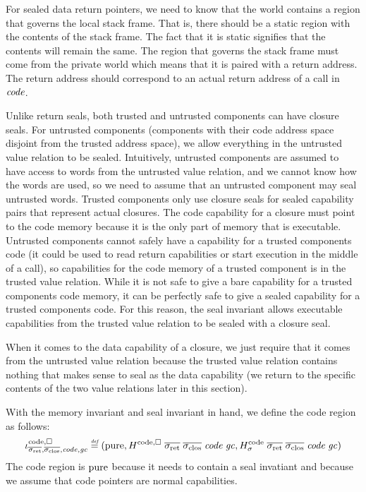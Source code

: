 \begin{jversion}
For sealed data return pointers, we need to know that the world contains a region that governs the local stack frame.
That is, there should be a static region with the contents of the stack frame.
The fact that it is static signifies that the contents will remain the same.
The region that governs the stack frame must come from the private world which means that it is paired with a return address.
The return address should correspond to an actual return address of a call in $\mathit{code}$.

Unlike return seals, both trusted and untrusted components can have closure seals.
For untrusted components (components with their code address space disjoint from the trusted address space), we allow everything in the untrusted value relation to be sealed.
Intuitively, untrusted components are assumed to have access to words from the untrusted value relation, and we cannot know how the words are used, so we need to assume that an untrusted component may seal untrusted words.
Trusted components only use closure seals for sealed capability pairs that represent actual closures.
The code capability for a closure must point to the code memory because it is the only part of memory that is executable.
Untrusted components cannot safely have a capability for a trusted components code (it could be used to read return capabilities or start execution in the middle of a call), so capabilities for the code memory of a trusted component is in the trusted value relation.
While it is not safe to give a bare capability for a trusted components code memory, it can be perfectly safe to give a sealed capability for a trusted components code.
For this reason, the seal invariant allows executable capabilities from the trusted value relation to be sealed with a closure seal.

When it comes to the data capability of a closure, we just require that it comes from the untrusted value relation because the trusted value relation contains nothing that makes sense to seal as the data capability (we return to the specific contents of the two value relations later in this section).

With the memory invariant and seal invariant in hand, we define the code region as follows:
\[
  \codereg{\sigrets,\sigcloss,\code,\gc} \defeq (\pure, H^\mathrm{code,\square} \; \sigrets \; \sigcloss \; \code \; \gc, H^\mathrm{code}_\sigma \; \sigrets \; \sigcloss \; \code \; \gc)
\]
The code region is $\mathrm{pure}$ because it needs to contain a seal invatiant and because we assume that code pointers are normal capabilities.


\end{jversion}
